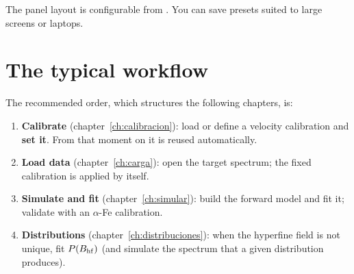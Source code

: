 
\begin{truco}
The panel layout is configurable from
. You can save presets suited to
large screens or laptops.
\end{truco}

\section{The typical workflow}

The recommended order, which structures the following chapters, is:

\begin{enumerate}[nosep]
  \item \textbf{Calibrate} (chapter~\ref{ch:calibracion}): load or define a
        velocity calibration and \textbf{set it}. From that moment on it is
        reused automatically.
  \item \textbf{Load data} (chapter~\ref{ch:carga}): open the target
        spectrum; the fixed calibration is applied by itself.
  \item \textbf{Simulate and fit} (chapter~\ref{ch:simular}): build the
        forward model and fit it; validate with an $\alpha$-Fe calibration.
  \item \textbf{Distributions} (chapter~\ref{ch:distribuciones}): when the
        hyperfine field is not unique, fit $P(B_{\mathrm{hf}})$ (and simulate the spectrum that
        a given distribution produces).
\end{enumerate}
